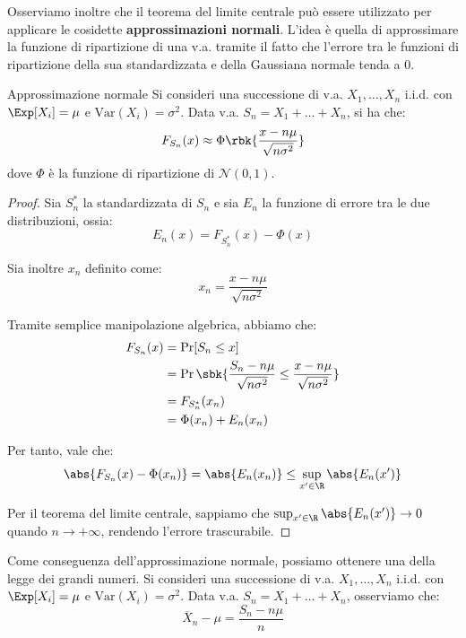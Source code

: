 \documentclass[a4paper, 12pt]{report}
\begin{document}
    Osserviamo inoltre che il teorema del limite centrale può essere utilizzato per applicare le cosidette \textbf{approssimazioni normali}. L'idea è quella di approssimare la funzione di ripartizione di una v.a. tramite il fatto che l'errore tra le funzioni di ripartizione della sua standardizzata e della Gaussiana normale tenda a 0.
    
    \begin{framedprop}{Approssimazione normale}
        Si consideri una successione di v.a. $X_1, \ldots, X_n$ i.i.d. con $\Exp[X_i] = \mu$ e $\mathrm{Var}(X_i) = \sigma^2$. Data v.a. $S_n = X_1 + \ldots + X_n$, si ha che:
        \[F_{S_n}(x) \approx \Phi\rbk{\frac{x-n \mu}{\sqrt{n \sigma^2}}}\]
        dove $\Phi$ è la funzione di ripartizione di $\mathcal{N}(0,1)$.
    \end{framedprop}

    \begin{proof}
        Sia $S^*_n$ la standardizzata di $S_n$ e sia $E_n$ la funzione di errore tra le due distribuzioni, ossia:
        \[E_n(x) = F_{S^*_n}(x)-\Phi(x)\]

        Sia inoltre $x_n$ definito come:
        \[x_n = \frac{x - n\mu}{\sqrt{n \sigma^2}}\]

        Tramite semplice manipolazione algebrica, abbiamo che:
        \[\begin{split}
            F_{S_n}(x) &= \Pr[S_n \leq x] \\
            &= \Pr\sbk{\frac{S_n - n\mu}{\sqrt{n \sigma^2}} \leq \frac{x - n\mu}{\sqrt{n \sigma^2}}} \\
            &= F_{S_n^*}(x_n) \\
            &= \Phi(x_n) + E_n(x_n)
        \end{split}\]

        Per tanto, vale che:
        \[\abs{F_{S_n}(x) - \Phi(x_n)} = \abs{E_n(x_n)} \leq \sup_{x' \in \R} \abs{E_n(x')}\]

        Per il teorema del limite centrale, sappiamo che $\sup_{x' \in \R} \abs{E_n(x')} \to 0$ quando $n \to +\infty$, rendendo l'errore trascurabile.
    \end{proof}

    Come conseguenza dell'approssimazione normale, possiamo ottenere una  della legge dei grandi numeri. Si consideri una successione di v.a. $X_1, \ldots, X_n$ i.i.d. con $\Exp[X_i] = \mu$ e $\mathrm{Var}(X_i) = \sigma^2$. Data v.a. $S_n = X_1 + \ldots + X_n$, osserviamo che:
    \[\overline{X}_n - \mu = \frac{S_n - n\mu}{n}\]
\end{document}
